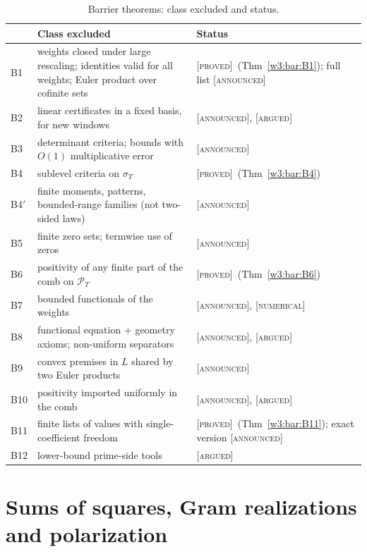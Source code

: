 \documentclass[11pt]{amsart}
\theoremstyle{definition}
\theoremstyle{remark}
\numberwithin{equation}{section}
\newcommand{\PT}{\mathcal{P}_T}                        %
\newcommand{\sT}{\sigma_T}                             %
\newcommand{\stag}[1]{\textsc{[#1]}}
\newcommand{\PROVED}{\stag{proved}}
\newcommand{\ARGUED}{\stag{argued}}
\newcommand{\NUM}{\stag{numerical}}
\newcommand{\ANNOUNCED}{\stag{announced}}
\begin{document}
\begin{table}[htbp]
\centering\small
\caption{Barrier theorems: class excluded and status.}\label{w3:tab:barriers}
\begin{tabular}{>{\raggedright}p{1cm}>{\raggedright}p{7.6cm}>{\raggedright\arraybackslash}p{3.6cm}}
\toprule
 & Class excluded & Status\\
\midrule
B1 & weights closed under large rescaling; identities valid for all weights; Euler product over cofinite sets & \PROVED\ (Thm~\ref{w3:bar:B1}); full list \ANNOUNCED\\
B2 & linear certificates in a fixed basis, for new windows & \ANNOUNCED, \ARGUED\\
B3 & determinant criteria; bounds with $O(1)$ multiplicative error & \ANNOUNCED\\
B4 & sublevel criteria on $\sT$ & \PROVED\ (Thm~\ref{w3:bar:B4})\\
B4$'$ & finite moments, patterns, bounded-range families (not two-sided laws) & \ANNOUNCED\\
B5 & finite zero sets; termwise use of zeros & \ANNOUNCED\\
B6 & positivity of any finite part of the comb on $\PT$ & \PROVED\ (Thm~\ref{w3:bar:B6})\\
B7 & bounded functionals of the weights & \ANNOUNCED, \NUM\\
B8 & functional equation + geometry axioms; non-uniform separators & \ANNOUNCED, \ARGUED\\
B9 & convex premises in $L$ shared by two Euler products & \ANNOUNCED\\
B10 & positivity imported uniformly in the comb & \ANNOUNCED, \ARGUED\\
B11 & finite lists of values with single-coefficient freedom & \PROVED\ (Thm~\ref{w3:bar:B11}); exact version \ANNOUNCED\\
B12 & lower-bound prime-side tools & \ARGUED\\
\bottomrule
\end{tabular}
\end{table}


\section{Sums of squares, Gram realizations and polarization}\label{w4:sec:squares}
\end{document}
